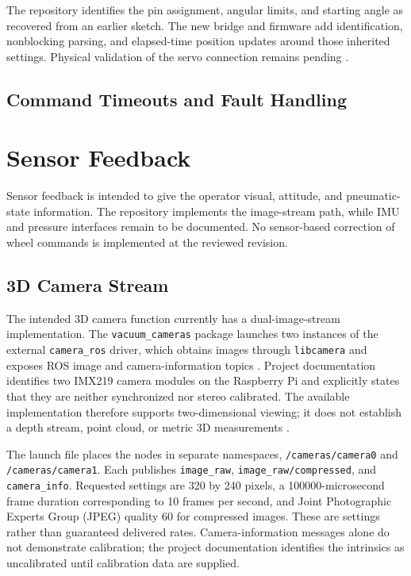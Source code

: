 The repository identifies the pin assignment, angular limits, and starting angle as recovered from an earlier sketch. The new bridge and firmware add identification, nonblocking parsing, and elapsed-time position updates around those inherited settings. Physical validation of the servo connection remains pending \citep{hernandezVacuumCrawler2026}.

\subsection{Command Timeouts and Fault Handling}
\label{sec:control-faults}
\section{Sensor Feedback}
\label{sec:sensor-camera}
Sensor feedback is intended to give the operator visual, attitude, and pneumatic-state information. The repository implements the image-stream path, while IMU and pressure interfaces remain to be documented. No sensor-based correction of wheel commands is implemented at the reviewed revision.

\subsection{3D Camera Stream}
\label{sec:camera-stream}
The intended 3D camera function currently has a dual-image-stream implementation. The \texttt{vacuum\_cameras} package launches two instances of the external \texttt{camera\_ros} driver, which obtains images through \texttt{libcamera} and exposes ROS image and camera-information topics \citep{cameraRosDriver}. Project documentation identifies two IMX219 camera modules on the Raspberry Pi and explicitly states that they are neither synchronized nor stereo calibrated. The available implementation therefore supports two-dimensional viewing; it does not establish a depth stream, point cloud, or metric 3D measurements \citep{hernandezVacuumCrawler2026}.

The launch file places the nodes in separate namespaces, \texttt{/cameras/camera0} and \texttt{/cameras/camera1}. Each publishes \texttt{image\_raw}, \texttt{image\_raw/compressed}, and \texttt{camera\_info}. Requested settings are 320 by 240 pixels, a 100000-microsecond frame duration corresponding to 10 frames per second, and Joint Photographic Experts Group (JPEG) quality 60 for compressed images. These are settings rather than guaranteed delivered rates. Camera-information messages alone do not demonstrate calibration; the project documentation identifies the intrinsics as uncalibrated until calibration data are supplied.


